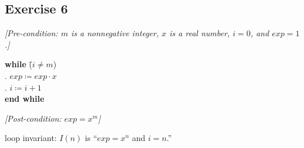 \documentclass[14pt]{extarticle}
\begin{document}
\subsection{Exercise 6}
{\it [Pre-condition: $m$ is a nonnegative integer, $x$ is a real number, $i = 0$, and $exp = 1$.]}

\begin{tabbing}
{\bf while} \= ($i \neq m$) \\
            . $exp \coloneqq exp \cdot x$ \\
            . $i \coloneqq i + 1$ \\
{\bf end while}
\end{tabbing}

{\it [Post-condition: $exp = x^m$]}

loop invariant: $I(n)$ is ``$exp = x^n$ and $i = n$.''
\end{document}
